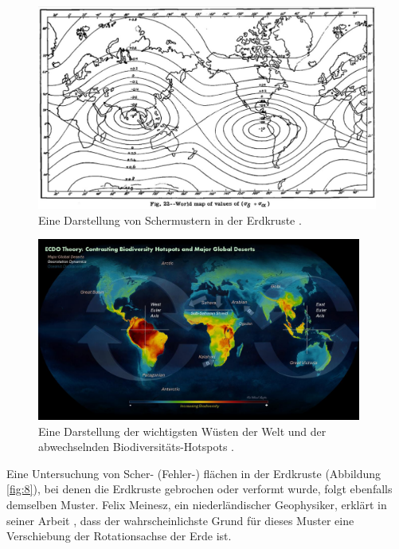 \documentclass[10pt,twocolumn,letterpaper]{article}
\begin{document}
\begin{figure}[t]
\begin{center}
   \includegraphics[width=1\linewidth]{meinesz3.jpg}
\end{center}
   \caption{Eine Darstellung von Schermustern in der Erdkruste \cite{36}.}
\label{fig:8}
\label{fig:onecol}
\end{figure}
\begin{figure}[t]
\begin{center}
\includegraphics[width=0.95\textwidth]{biodiversity.jpg}
\end{center}
   \caption{Eine Darstellung der wichtigsten Wüsten der Welt und der abwechselnden Biodiversitäts-Hotspots \cite{28}.}
\label{fig:9}
\end{figure}

Eine Untersuchung von Scher- (Fehler-) flächen in der Erdkruste (Abbildung \ref{fig:8}), bei denen die Erdkruste gebrochen oder verformt wurde, folgt ebenfalls demselben Muster. Felix Meinesz, ein niederländischer Geophysiker, erklärt in seiner Arbeit \cite{36}, dass der wahrscheinlichste Grund für dieses Muster eine Verschiebung der Rotationsachse der Erde ist.
\end{document}
